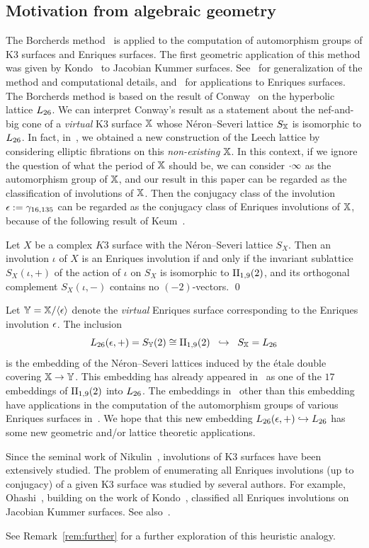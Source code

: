 \documentclass{amsart} %
\begin{document}
\subsection{Motivation from algebraic geometry}\label{subsec:alggeom}
%
The Borcherds method~\cite{MR913200, MR1654763}
is applied to the computation of automorphism groups of K3 surfaces and Enriques surfaces.
The first geometric application of this method was given 
by Kondo~\cite{MR1618132} to Jacobian Kummer surfaces.
See~\cite{MR3456710, MR4759604} for generalization of the method and computational details,
and~\cite{MR4498439, MR4389670} for applications to Enriques surfaces.
The Borcherds method is based on the result of Conway~\cite{MR690711} on 
the hyperbolic lattice $L_{26}$. 
We can interpret Conway's result 
as a statement about the nef-and-big cone of a \emph{virtual} K3 surface $\mathord{\mathbb{X}}$
 whose N\'eron--Severi lattice $S_{\mathord{\mathbb{X}}}$ is isomorphic to $L_{26}$.
 In fact,
in~\cite{MR4674939}, 
we obtained a new construction of the Leech lattice
by considering elliptic fibrations on this \emph{non-existing} $\mathord{\mathbb{X}}$.
In this context, 
if we ignore  the question of what the period of $\mathord{\mathbb{X}}$ should be, 
we can consider $\cdot \infty$ as 
the automorphism group of $\mathord{\mathbb{X}}$,
and our result in this paper can be regarded as the classification of involutions of $\mathord{\mathbb{X}}$.
Then 
the conjugacy class of the involution $\epsilon:=\gamma_{16, 135}$ can be regarded 
 as the conjugacy class of Enriques involutions of $\mathord{\mathbb{X}}$,
 because of the following result of Keum~\cite{MR1060704}.
 \begin{proposition}
 Let $X$ be a complex $K3$ surface
with the N\'eron--Severi lattice $S_X$.
 Then an involution $\iota$ of $X$ is an Enriques involution
 if and only if the invariant sublattice $S_X(\iota, +)$ of 
 the action of $\iota$ on $S_X$ 
 is isomorphic to $\mathrm{II}_{1,9} (2)$,
 and its orthogonal complement $S_X(\iota, -)$
contains no $(-2)$-vectors.
 \qed
 \end{proposition}
%
Let $\mathord{\mathbb{Y}}=\mathord{\mathbb{X}}/\langle {\epsilon} \rangle$ denote the \emph{virtual} Enriques surface
corresponding to the Enriques involution $\epsilon$.
The inclusion 
\[
L_{26}(\epsilon, +)=S_{\mathord{\mathbb{Y}}}(2)\cong \mathrm{II}_{1,9} (2)\;\; \hookrightarrow \;\;S_{\mathord{\mathbb{X}}}=L_{26}
\]
is the embedding of the N\'eron--Severi lattices
induced by the \'etale double covering $\mathord{\mathbb{X}}\to \mathord{\mathbb{Y}}$.
This embedding 
has already appeared in~\cite{MR4389670} as one of the $17$ embeddings 
of $\mathrm{II}_{1,9} (2)$ into $L_{26}$.
The embeddings in~\cite{MR4389670} other than this embedding 
have applications in the computation of the automorphism groups
of various Enriques surfaces in~\cite{MR4498439}.
We hope that this new embedding  $L_{26}(\epsilon, +)\hookrightarrow L_{26}$
has some new geometric and/or lattice theoretic applications.
%
\par
Since the seminal work of Nikulin~\cite{MR633160}, 
involutions of K3 surfaces have been extensively studied.
The problem of enumerating all Enriques involutions 
(up to conjugacy) of a given K3 surface was
studied by several authors.
For example, Ohashi~\cite{MR2552959},
building on the work of Kondo~\cite{MR1618132}, 
 classified all Enriques involutions on Jacobian Kummer surfaces. 
 See also~\cite{MR4288644}.
%
\par
See  Remark~\ref{rem:further}
for a further exploration of this heuristic analogy.
%
\end{document}
